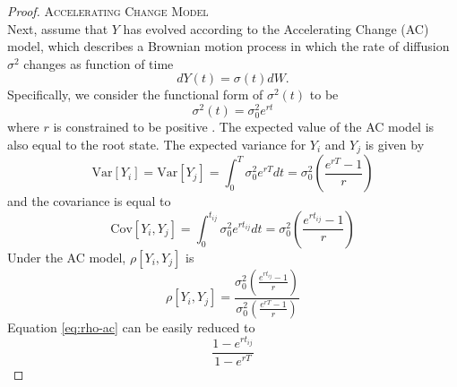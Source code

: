 \documentclass[12pt,twoside]{article}
\newcommand{\Var}{\mathrm{Var}}
\newcommand{\Cov}{\mathrm{Cov}}
\begin{document}
\begin{proof}
\par{\textsc{Accelerating Change Model}}\\
Next, assume that $Y$ has evolved according to the Accelerating Change (AC) model, which describes a Brownian motion process in which the rate of diffusion $\sigma^2$ changes as function of time
\begin{equation}
dY(t)=\sigma(t)dW. 
\end{equation}
Specifically, we consider the functional form of $\sigma^2(t)$ to be
\[\sigma^2 (t) = \sigma^2_0 e^{rt}\]
where $r$ is constrained to be positive \citep{Blomberg2003, SlaterFossil}. The expected value of the AC model is also equal to the root state. The expected variance for $Y_i$ and $Y_j$ is given by
\begin{equation}\label{eq:var-ac}
\Var[Y_i] = \Var[Y_j] = \int^T_0 \sigma^2_0 e^{rT} dt = \sigma^2_0 \left( \frac{e^{rT} - 1}{r} \right)
\end{equation}
\citep{Harmon2010} and the covariance is equal to
\begin{equation}
\Cov[Y_i,Y_j] = \int^{t_{ij}}_0 \sigma^2_0 e^{rt_{ij}} dt = \sigma^2_0 \left( \frac{e^{rt_{ij}} - 1}{r} \right)
\end{equation}
Under the AC model, $\rho[Y_i, Y_j]$ is
\begin{equation}\label{eq:rho-ac}
\rho[Y_i, Y_j] = \frac{\sigma^2_0 \left( \frac{e^{rt_{ij}} - 1}{r} \right)}{\sigma^2_0 \left( \frac{e^{rT} - 1}{r} \right)}
\end{equation}
Equation \ref{eq:rho-ac} can be easily reduced to
\begin{equation}
\frac{1-e^{rt_{ij}}}{1-e^{r T}}
\end{equation}\bigskip


\end{proof}
\end{document}
